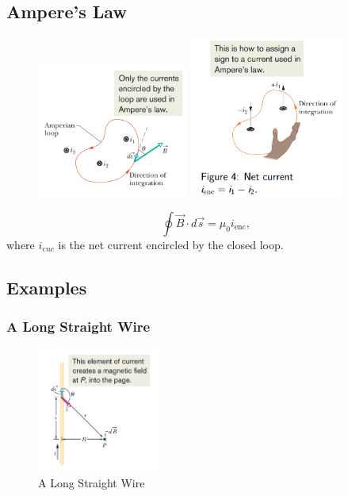 \documentclass[11pt, a4paper]{article}
\begin{document}
\subsection{Ampere's Law}
\begin{figure}[htbp]
    \centering
    \includegraphics[width = 5cm]{Amprerian Loop.png}
    \includegraphics[width = 5cm]{net current sign.png}
\end{figure}
$$\oint\vec{B}\cdot d\vec{s}=\mu_0i_{\mathrm{enc}},$$
where $i_{enc}$ is the net current encircled by the closed loop.

\subsection{Examples}
\subsubsection{ A Long Straight Wire}
\begin{figure}[htbp]
    \centering
    \includegraphics[width = 4cm]{Long straight wire .png}
    \caption{A Long Straight Wire}
\end{figure}
\end{document}
